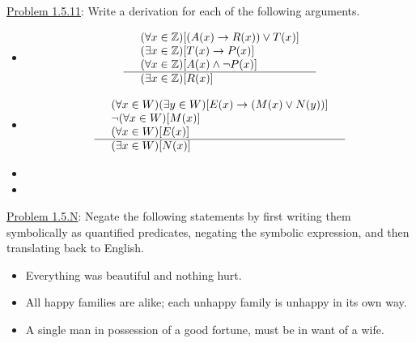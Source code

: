 \documentclass{article}
\theoremstyle{definition}
\newcommand{\Z}{\mathbb{Z}}
\begin{document}
	\noindent \underline{Problem 1.5.11}: Write a derivation for each of the following arguments.
	\begin{itemize}
		\item[(3)] $$\begin{array}{llr}
						 & (\forall x\in \Z)[(A(x)\rightarrow R(x))\vee T(x)] &\\
						 & (\exists x \in \Z)[T(x)\rightarrow P(x)]&\\
						 & (\forall x \in \Z)[A(x)\wedge \neg P(x)] & \\\hline
						 & (\exists x \in \Z)[R(x)] &
		\end{array}$$

		\item[(4)] $$\begin{array}{llr}
						 & (\forall x\in W)(\exists y \in W)[E(x)\rightarrow (M(x)\vee N(y))] &\\
						 & \neg(\forall x \in W)[M(x)]&\\
						 & (\forall x \in W)[E(x)] & \\\hline
						 & (\exists x \in W)[N(x)] &
		\end{array}$$
	\end{itemize}

	\vspace{0.25cm}
	\begin{itemize}
		\item[(3)]
		\item[(4)]
	\end{itemize}

	\vspace{.5cm}



	\noindent \underline{Problem 1.5.N}: Negate the following statements by first writing them symbolically as quantified predicates, negating the symbolic expression, and then translating back to English.
	\begin{itemize}

		\item[(1)] Everything was beautiful and nothing hurt.
		\item[(2)] All happy families are alike; each unhappy family is unhappy in its own way.
		\item[(3)] A single man in possession of a good fortune, must be in want of a wife.

	\end{itemize}
\end{document}
